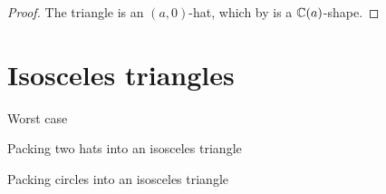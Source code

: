 \documentclass[a4paper,style=print,bibliography=totoc,nexus,lnum,extramargin]{tubsbook}
\begin{document}
\begin{proof}
    The triangle is an $(a,0)$-hat, which by  is a $\mathbb{C}(a)$-shape.
\end{proof}

\section{Isosceles triangles}

Worst case

Packing two hats into an isosceles triangle

Packing circles into an isosceles triangle

%
%
%
%
%
%
%
%
\end{document}
